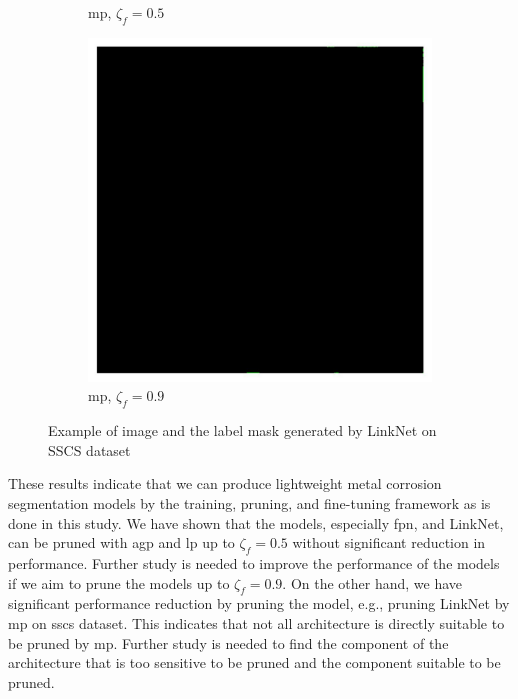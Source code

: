 \documentclass[mathematics,article,submit,pdftex,moreauthors]{Definitions/mdpi}
\begin{document}
\begin{figure}[!ht]
\begin{subfigure}[t]{.29\textwidth}
      \caption{\ac{mp}, $\zeta_f=0.5$}
      \label{fig:results:pruning:visualization:ccsc-linknet-mp-0.5}
    \end{subfigure}
    \begin{subfigure}[t]{.29\textwidth} 
      \centering
      \includegraphics[width=.95\linewidth]{figures/pruning-results/linknet_CCSC_movement/0/mask_0.9.jpg}
      \caption{\ac{mp}, $\zeta_f=0.9$}
      \label{fig:results:pruning:visualization:ccsc-linknet-mp-0.9}
    \end{subfigure}
    \caption{Example of image and the label mask generated by LinkNet on SSCS dataset}
    \label{fig:results:pruning:visualization:ccsc}
\end{figure}

These results indicate that we can produce lightweight
metal corrosion segmentation models by the training, 
pruning, and fine-tuning framework as is done in this study.
We have shown that the models, especially \ac{fpn},
and LinkNet, can be pruned with \ac{agp}
and \ac{lp} up to $\zeta_f=0.5$ without
significant reduction in performance. 
Further study is needed to improve the performance of the models
if we aim to prune the models up to $\zeta_f=0.9$. 
On the other hand, we have
significant performance reduction 
by pruning the model, e.g., pruning LinkNet by \ac{mp}
on \ac{sscs} dataset. This indicates that not all
architecture is directly suitable to be pruned by \ac{mp}.
Further study is needed to find the component of the
architecture that is too sensitive to be pruned
and the component suitable to be pruned. 
\end{document}
